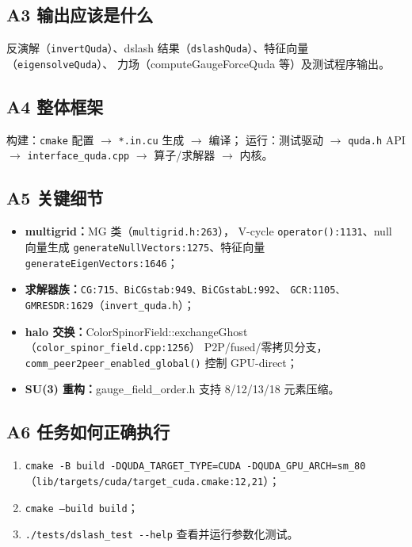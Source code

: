 \documentclass[UTF8]{ctexart}
\begin{document}
\subsection{A3 输出应该是什么}
反演解（\texttt{invertQuda}）、dslash 结果（\texttt{dslashQuda}）、特征向量（\texttt{eigensolveQuda}）、
力场（computeGaugeForceQuda 等）及测试程序输出。

\subsection{A4 整体框架}
构建：\texttt{cmake} 配置 $\rightarrow$ \texttt{*.in.cu} 生成 $\rightarrow$ 编译；
运行：测试驱动 $\rightarrow$ \texttt{quda.h} API $\rightarrow$ \nolinkurl{interface_quda.cpp}
$\rightarrow$ 算子/求解器 $\rightarrow$ 内核。

\subsection{A5 关键细节}
\begin{itemize}
  \item \textbf{multigrid：}MG 类（\nolinkurl{multigrid.h:263}），
        V-cycle \nolinkurl{operator():1131}、null 向量生成
        \nolinkurl{generateNullVectors:1275}、特征向量
        \nolinkurl{generateEigenVectors:1646}；
  \item \textbf{求解器族：}\nolinkurl{CG:715、BiCGstab:949、BiCGstabL:992}、
        \nolinkurl{GCR:1105、GMRESDR:1629}（\nolinkurl{invert_quda.h}）；
  \item \textbf{halo 交换：}ColorSpinorField::exchangeGhost（\nolinkurl{color_spinor_field.cpp:1256}）
        P2P/fused/零拷贝分支，\nolinkurl{comm_peer2peer_enabled_global()} 控制 GPU-direct；
  \item \textbf{SU(3) 重构：}gauge\_field\_order.h 支持 8/12/13/18 元素压缩。
\end{itemize}

\subsection{A6 任务如何正确执行}
\begin{enumerate}
  \item \nolinkurl{cmake -B build -DQUDA_TARGET_TYPE=CUDA -DQUDA_GPU_ARCH=sm_80}
        （\nolinkurl{lib/targets/cuda/target_cuda.cmake:12,21}）；
  \item \texttt{cmake --build build}；
  \item \nolinkurl{./tests/dslash_test --help} 查看并运行参数化测试。
\end{enumerate}
\end{document}
